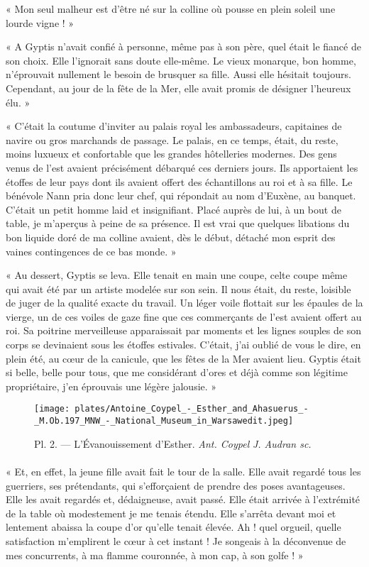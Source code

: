 \documentclass[a4paper, 11pt, oneside, polutonikogreek, french]{article}
\begin{document}
« Mon seul malheur est d'être né sur la colline où pousse en plein soleil une lourde vigne ! »

« A Gyptis n'avait confié à personne, même pas à son père, quel était le fiancé de son choix. Elle l'ignorait sans doute elle-même. Le vieux monarque, bon homme, n'éprouvait nullement le besoin de brusquer sa fille. Aussi elle hésitait toujours. Cependant, au jour de la fête de la Mer, elle avait promis de désigner l'heureux élu. »

« C'était la coutume d'inviter au palais royal les ambassadeurs, capitaines de navire ou gros marchands de passage. Le palais, en ce temps, était, du reste, moins luxueux et confortable que les grandes hôtelleries modernes. Des gens venus de l'est avaient précisément débarqué ces derniers jours. Ils apportaient les étoffes de leur pays dont ils avaient offert des échantillons au roi et à sa fille. Le bénévole Nann pria donc leur chef, qui répondait au nom d'Euxène, au banquet. C'était un petit homme laid et insignifiant. Placé auprès de lui, à un bout de table, je m'aperçus à peine de sa présence. Il est vrai que quelques libations du bon liquide doré de ma colline avaient, dès le début, détaché mon esprit des vaines contingences de ce bas monde. »

« Au dessert, Gyptis se leva. Elle tenait en main une coupe, celte coupe même qui avait été par un artiste modelée sur son sein. Il nous était, du reste, loisible de juger de la qualité exacte du travail. Un léger voile flottait sur les épaules de la vierge, un de ces voiles de gaze fine que ces commerçants de l'est avaient offert au roi. Sa poitrine merveilleuse apparaissait par moments et les lignes souples de son corps se devinaient sous les étoffes estivales. C'était, j'ai oublié de vous le dire, en plein été, au cœur de la canicule, que les fêtes de la Mer avaient lieu. Gyptis était si belle, belle pour tous, que me considérant d'ores et déjà comme son légitime propriétaire, j'en éprouvais une légère jalousie. »
\clearpage
\begin{landscape}
\begin{figure}[H]
\centering
\texttt{[image: plates/Antoine\_Coypel\_-\_Esther\_and\_Ahasuerus\_-\_M.Ob.197\_MNW\_-\_National\_Museum\_in\_Warsawedit.jpeg]}
\caption{Pl. 2. --- L'Évanouissement d'Esther. \emph{Ant. Coypel} \emph{J. Audran sc.}}
\end{figure}
\end{landscape}
\clearpage
\paragraph{}
« Et, en effet, la jeune fille avait fait le tour de la salle. Elle avait regardé tous les guerriers, ses prétendants, qui s'efforçaient de prendre des poses avantageuses. Elle les avait regardés et, dédaigneuse, avait passé. Elle était arrivée à l'extrémité de la table où modestement je me tenais étendu. Elle s'arrêta devant moi et lentement abaissa la coupe d'or qu'elle tenait élevée. Ah ! quel orgueil, quelle satisfaction m'emplirent le cœur à cet instant ! Je songeais à la déconvenue de mes concurrents, à ma flamme couronnée, à mon cap, à son golfe ! »
\end{document}

